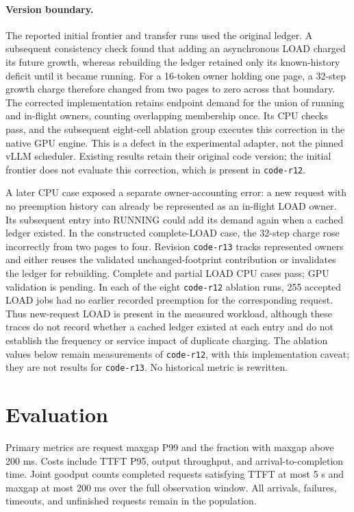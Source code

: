 \documentclass[11pt]{article}
\begin{document}
\paragraph{Version boundary.}
The reported initial frontier and transfer runs used the original ledger.
A subsequent consistency check found that adding an asynchronous LOAD
charged its future growth, whereas rebuilding the ledger retained only its
known-history deficit until it became running. For a 16-token owner holding
one page, a 32-step growth charge therefore changed from two pages to zero
across that boundary. The corrected implementation retains endpoint demand
for the union of running and in-flight owners, counting overlapping membership
once. Its CPU checks pass, and the subsequent eight-cell ablation group
executes this correction in the native GPU engine.
This is a defect in the experimental adapter, not the pinned vLLM scheduler.
Existing results retain their original code version; the initial frontier
does not evaluate this correction, which is present in \texttt{code-r12}.

A later CPU case exposed a separate owner-accounting error: a new request
with no preemption history can already be represented as an in-flight LOAD
owner. Its subsequent entry into RUNNING could add its demand again when
a cached ledger existed. In the constructed complete-LOAD case, the
32-step charge rose incorrectly from two pages to four. Revision
\texttt{code-r13} tracks represented owners and either reuses the validated
unchanged-footprint contribution or invalidates the ledger for rebuilding.
Complete and partial LOAD CPU cases pass; GPU validation is pending.
In each of the eight \texttt{code-r12} ablation runs, 255 accepted LOAD jobs
had no earlier recorded preemption for the corresponding request. Thus new-request
LOAD is present in the measured workload, although these traces do not record
whether a cached ledger existed at each entry and do not establish the
frequency or service impact of duplicate charging. The ablation values below
remain measurements of \texttt{code-r12}, with this implementation caveat;
they are not results for \texttt{code-r13}. No historical metric is rewritten.
\section{Evaluation}
Primary metrics are request maxgap P99 and the fraction with maxgap above
200 ms. Costs include TTFT P95, output throughput, and arrival-to-completion
time. Joint goodput counts completed requests satisfying TTFT at most 5 s
and maxgap at most 200 ms over the full observation window. All arrivals,
failures, timeouts, and unfinished requests remain in the population.
\end{document}
